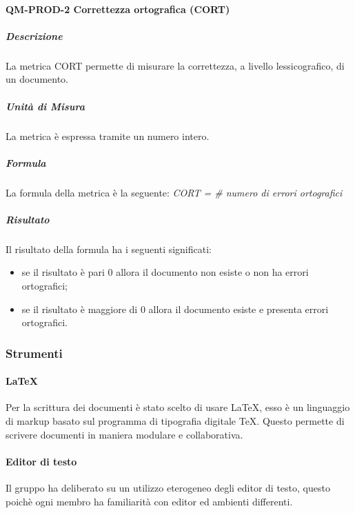 			\paragraph{QM-PROD-2 Correttezza ortografica (CORT)}
				\subparagraph{Descrizione}
					La metrica CORT permette di misurare la correttezza, a livello lessicografico, di un documento.
				\subparagraph{Unità di Misura}
					La metrica è espressa tramite un numero intero.
				\subparagraph{Formula}
					La formula della metrica è la seguente:
					\textit{CORT = \# numero di errori ortografici}
				\subparagraph{Risultato}
					Il risultato della formula ha i seguenti significati:
					\begin{itemize}
						\item se il risultato è pari 0 allora il documento non esiste o non ha errori ortografici;
						\item se il risultato è maggiore di 0 allora il documento esiste e presenta errori ortografici.
					\end{itemize}

		\subsubsection{Strumenti}
			\paragraph{LaTeX}
				Per la scrittura dei documenti è stato scelto di usare \LaTeX{}, esso è un linguaggio di markup basato sul programma di tipografia digitale \TeX{}. Questo permette di scrivere documenti in maniera modulare e collaborativa.
			\paragraph{Editor di testo}
				Il gruppo ha deliberato su un utilizzo eterogeneo degli editor di testo, questo poichè ogni membro ha familiarità con editor ed ambienti differenti.
